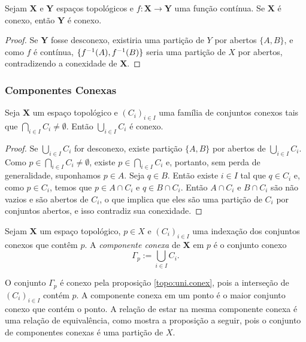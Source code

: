 \begin{prop}
Sejam $\bm X$ e $\bm Y$ espaços topológicos e $f: \bm X \to \bm Y$ uma função contínua. Se $\bm X$ é conexo, então $\bm Y$ é conexo.
\end{prop}
\begin{proof}
Se $\bm Y$ fosse desconexo, existiria uma partição de $Y$ por abertos $\{A,B\}$, e como $f$ é contínua, $\{f^{-1}(A),f^{-1}(B)\}$ seria uma partição de $X$ por abertos, contradizendo a conexidade de $\bm X$.
\end{proof}

\subsubsection{Componentes Conexas}

\begin{prop}
\label{topo:uni.conex}
Seja $\bm X$ um espaço topológico e $(C_i)_{i \in I}$ uma família de conjuntos conexos tais que $\bigcap_{i \in I} C_i \neq \emptyset$. Então $\bigcup_{i \in I} C_i$ é conexo.
\end{prop}
\begin{proof}
Se $\bigcup_{i \in I} C_i$ for desconexo, existe partição $\{A,B\}$ por abertos de $\bigcup_{i \in I} C_i$. Como $p \in \bigcap_{i \in I} C_i \neq \emptyset$, existe $p \in \bigcap_{i \in I} C_i$ e, portanto, sem perda de generalidade, suponhamos $p \in A$. Seja $q \in B$. Então existe $i \in I$ tal que $q \in C_i$ e, como $p \in C_i$, temos que $p \in A \cap C_i$ e $q \in B \cap C_i$. Então $A \cap C_i$ e $B \cap C_i$ são não vazios e são abertos de $C_i$, o que implica que eles são uma partição de $C_i$ por conjuntos abertos, e isso contradiz sua conexidade.
\end{proof}

\begin{defi}
Sejam $\bm X$ um espaço topológico, $p \in X$ e $(C_i)_{i \in I}$ uma indexação dos conjuntos conexos que contêm $p$. A \emph{componente conexa} de $\bm X$ em $p$ é o conjunto conexo
	\begin{equation*}
	\Gamma_p := \bigcup_{i \in I} C_i.
	\end{equation*}
\end{defi}

O conjunto $\Gamma_p$ é conexo pela proposição \ref{topo:uni.conex}, pois a interseção de $(C_i)_{i \in I}$ contém $p$. A componente conexa em um ponto é o maior conjunto conexo que contém o ponto. A relação de estar na mesma componente conexa é uma relação de equivalência, como mostra a proposição a seguir, pois o conjunto de componentes conexas é uma partição de $X$.

